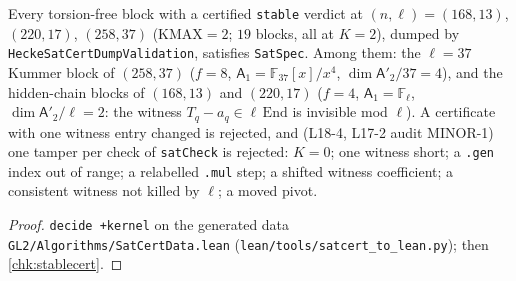 \begin{theorem}\label{chk:stablecert-real}
  \leanok
  Every torsion-free block with a certified \texttt{stable} verdict at $(n,\ell)=(168,13)$, $(220,17)$, $(258,37)$
  ($\mathrm{KMAX}=2$; $19$ blocks, all at $K=2$), dumped by \texttt{HeckeSatCertDumpValidation}, satisfies \texttt{SatSpec}. Among them:
  the $\ell=37$ Kummer block of $(258,37)$ ($f=8$, $\mathsf A_1=\mathbb F_{37}[x]/x^4$, $\dim\mathsf A'_2/37=4$), and the
  hidden-chain blocks of $(168,13)$ and $(220,17)$ ($f=4$, $\mathsf A_1=\mathbb F_\ell$, $\dim\mathsf A'_2/\ell=2$: the witness
  $T_q-a_q\in\ell\,\mathrm{End}$ is invisible mod $\ell$). A certificate with one witness entry changed is rejected, and (L18-4,
  L17-2 audit MINOR-1) one tamper per check of \texttt{satCheck} is rejected: $K=0$; one witness short; a \texttt{.gen} index out of
  range; a relabelled \texttt{.mul} step; a shifted witness coefficient; a consistent witness not killed by $\ell$; a moved pivot.
\end{theorem}
\begin{proof}
  \leanok
  \texttt{decide +kernel} on the generated data \texttt{GL2/Algorithms/SatCertData.lean} (\texttt{lean/tools/satcert\_to\_lean.py});
  then \ref{chk:stablecert}.
\end{proof}
